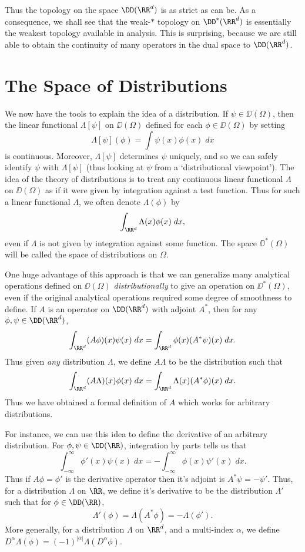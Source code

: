 Thus the topology on the space $\DD(\RR^d)$ is as strict as can be. As a consequence, we shall see that the weak-$*$ topology on $\DD^*(\RR^d)$ is essentially the weakest topology available in analysis. This is surprising, because we are still able to obtain the continuity of many operators in the dual space to $\DD(\RR^d)$.

\section{The Space of Distributions}

We now have the tools to explain the idea of a distribution. If $\psi \in \DD(\Omega)$, then the linear functional $\Lambda[\psi]$ on $\DD(\Omega)$ defined for each $\phi \in \DD(\Omega)$ by setting
%
\[ \Lambda[\psi](\phi) = \int \psi(x) \phi(x)\; dx \]
%
is continuous. Moreover, $\Lambda[\psi]$ determines $\psi$ uniquely, and so we can safely identify $\psi$ with $\Lambda[\psi]$ (thus looking at $\psi$ from a `distributional viewpoint'). The idea of the theory of distributions is to treat any continuous linear functional $\Lambda$ on $\DD(\Omega)$ as if it were given by integration against a test function. Thus for such a linear functional $\Lambda$, we often denote $\Lambda(\phi)$ by
%
\[ \int_{\RR^d} \Lambda(x) \phi(x)\; dx, \]
%
even if $\Lambda$ is not given by integration against some function. The space $\DD^*(\Omega)$ will be called the space of distributions on $\Omega$.

One huge advantage of this approach is that we can generalize many analytical operations defined on $\DD(\Omega)$ \emph{distributionally} to give an operation on $\DD^*(\Omega)$, even if the original analytical operations required some degree of smoothness to define. If $A$ is an operator on $\DD(\RR^d)$ with adjoint $A^*$, then for any $\phi,\psi \in \DD(\RR^d)$,
%
\[ \int_{\RR^d} (A\phi)(x) \psi(x)\; dx = \int_{\RR^d} \phi(x) (A^* \psi)(x)\; dx. \]
%
Thus given \emph{any} distribution $\Lambda$, we define $A \Lambda$ to be the distribution such that
%
\[ \int_{\RR^d} (A \Lambda)(x) \phi(x)\; dx = \int_{\RR^d} \Lambda(x) (A^* \phi)(x)\; dx. \]
%
Thus we have obtained a formal definition of $A$ which works for arbitrary distributions.

For instance, we can use this idea to define the derivative of an arbitrary distribution. For $\phi,\psi \in \DD(\RR)$, integration by parts tells us that
%
\[ \int_{-\infty}^\infty \phi'(x) \psi(x)\; dx = - \int_{-\infty}^\infty \phi(x) \psi'(x)\; dx. \]
%
Thus if $A\phi = \phi'$ is the derivative operator then it's adjoint is $A^* \psi = - \psi'$. Thus, for a distribution $\Lambda$ on $\RR$, we define it's derivative to be the distribution $\Lambda'$ such that for $\phi \in \DD(\RR)$,
%
\[ \Lambda'(\phi) = \Lambda(A^* \phi) = - \Lambda(\phi'). \]
%
More generally, for a distribution $\Lambda$ on $\RR^d$, and a multi-index $\alpha$, we define $D^\alpha \Lambda(\phi) = (-1)^{|\alpha|} \Lambda(D^\alpha \phi)$.

